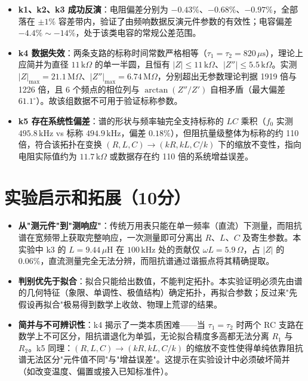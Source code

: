 \documentclass[12pt,a4paper]{ctexart}
\begin{document}
\begin{itemize}
    \item \textbf{k1、k2、k3 成功反演}：电阻偏差分别为 $-0.43\%$、$-0.68\%$、$-0.97\%$，全部落在 $\pm1\%$ 容差带内，验证了由频响数据反演元件参数的有效性；电容偏差 $-4.4\%\sim-14\%$，处于该类电容的常规公差范围。
    \item \textbf{k4 数据失效}：两条支路的标称时间常数严格相等（$\tau_1=\tau_2=820\,\mu\mathrm{s}$），理论上应简并为直径 $11\,\mathrm{k}\Omega$ 的单一半圆，且恒有 $|Z|\le11\,\mathrm{k}\Omega$、$|Z''|\le5.5\,\mathrm{k}\Omega$。实测 $|Z|_{\max}=21.1\,\mathrm{M}\Omega$、$|Z''|_{\max}=6.74\,\mathrm{M}\Omega$，分别超出无参数理论判据 1919 倍与 1226 倍，且 6 个频点的相位列与 $\arctan(Z''/Z')$ 自相矛盾（最大偏差 $61.1^\circ$）。故该组数据不可用于验证标称参数。
    \item \textbf{k5 存在系统性偏差}：谱的形状与频率轴完全支持标称的 $LC$ 乘积（$f_0$ 实测 $495.8\,\mathrm{kHz}$ vs 标称 $494.9\,\mathrm{kHz}$，偏差 $0.18\%$），但阻抗量级整体为标称的约 110 倍，符合该拓扑在变换 $(R,L,C)\to(kR,kL,C/k)$ 下的缩放不变性，指向电阻实际值约为 $11.7\,\mathrm{k}\Omega$ 或数据存在约 110 倍的系统增益误差。
\end{itemize}

\section*{实验启示和拓展（10分）}

\begin{itemize}
    \item \textbf{从"测元件"到"测响应"}：传统万用表只能在单一频率（直流）下测量，而阻抗谱在宽频带上获取完整响应，一次测量即可分离出 $R$、$L$、$C$ 及寄生参数。本实验中 k3 的 $L=9.44\,\mu\mathrm{H}$ 在 $100\,\mathrm{kHz}$ 处的贡献仅 $\omega L=5.9\,\Omega$，占 $|Z|$ 的 $0.06\%$，直流测量完全无法分辨，而阻抗谱通过谐振点将其精确提取。
    \item \textbf{判别优先于拟合}：拟合只能给出数值，不能判定拓扑。本实验证明必须先由谱的几何特征（象限、单调性、极值结构）确定拓扑，再拟合参数；反过来"先假设再拟合"极易得到数学上收敛、物理上荒谬的结果。
    \item \textbf{简并与不可辨识性}：k4 揭示了一类本质困难——当 $\tau_1=\tau_2$ 时两个 RC 支路在数学上不可区分，阻抗谱退化为单弧，无论拟合精度多高都无法分离 $R_1$ 与 $R_2$。k5 同理：$(R,L,C)\to(kR,kL,C/k)$ 的缩放不变性使得单纯依靠阻抗谱无法区分"元件值不同"与"增益误差"。这提示在实验设计中必须破坏简并（如改变温度、偏置或接入已知标准件）。
\end{itemize}
\end{document}

